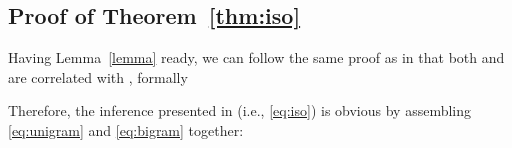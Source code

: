 \documentclass{article} \usepackage{acl2017,times}
\begin{document}
\subsection{Proof of Theorem~\ref{thm:iso}}

Having Lemma~\ref{lemma} ready, we can follow the same proof as in \citep{arora2015rand} that both  and  are correlated with , formally
    
Therefore, the inference presented in \citep{arora2015rand} (i.e., \eqref{eq:iso}) is obvious by assembling \eqref{eq:unigram} and \eqref{eq:bigram} together:
\end{document}

